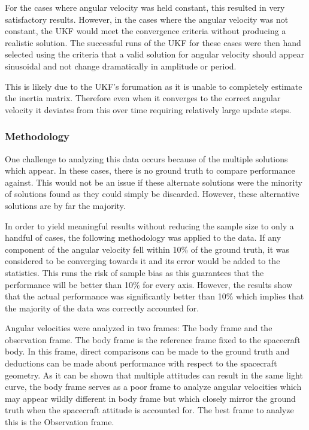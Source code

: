 For the cases where angular velocity was held constant, this resulted in very satisfactory results. However, in the cases where the angular velocity was not constant, the UKF would meet the convergence criteria without producing a realistic solution. The successful runs of the UKF for these cases were then hand selected using the criteria that a valid solution for angular velocity should appear sinusoidal and not change dramatically in amplitude or period.

This is likely due to the UKF's forumation as it is unable to completely estimate the inertia matrix. Therefore even when it converges to the correct angular velocity it deviates from this over time requiring relatively large update steps.

\subsubsection{Methodology}

One challenge to analyzing this data occurs because of the multiple solutions which appear. In these cases, there is no ground truth to compare performance against. This would not be an issue if these alternate solutions were the minority of solutions found as they could simply be discarded. However, these alternative solutions are by far the majority.

In order to yield meaningful results without reducing the sample size to only a handful of cases, the following methodology was applied to the data. If any component of the angular velocity fell within 10\% of the ground truth, it was considered to be converging towards it and its error would be added to the statistics. This runs the risk of sample bias as this guarantees that the performance will be better than 10\% for every axis. However, the results show that the actual performance was significantly better than 10\% which implies that the majority of the data was correctly accounted for.

Angular velocities were analyzed in two frames: The body frame and the observation frame. The body frame is the reference frame fixed to the spacecraft body. In this frame, direct comparisons can be made to the ground truth and deductions can be made about performance with respect to the spacecraft geometry. As it can be shown that multiple attitudes can result in the same light curve, the body frame serves as a poor frame to analyze angular velocities which may appear wildly different in body frame but which closely mirror the ground truth when the spacecraft attitude is accounted for. The best frame to analyze this is the Observation frame.

